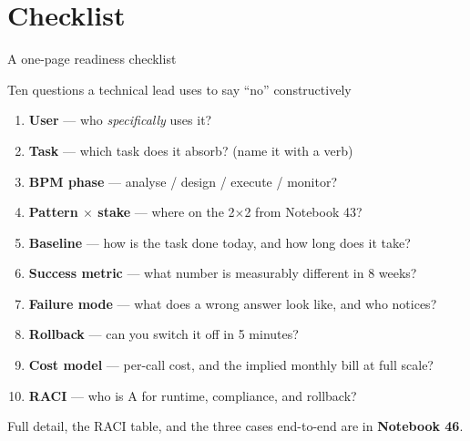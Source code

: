 \documentclass[aspectratio=169,11pt]{beamer}
\begin{document}
\section{Checklist}
\begin{frame}{A one-page readiness checklist}
  \footnotesize
  \begin{block}{Ten questions a technical lead uses to say ``no'' constructively}
    \begin{enumerate}
      \item \textbf{User} --- who \emph{specifically} uses it?
      \item \textbf{Task} --- which task does it absorb? (name it with a verb)
      \item \textbf{BPM phase} --- analyse / design / execute / monitor?
      \item \textbf{Pattern $\times$ stake} --- where on the 2$\times$2 from Notebook 43?
      \item \textbf{Baseline} --- how is the task done today, and how long does it take?
      \item \textbf{Success metric} --- what number is measurably different in 8 weeks?
      \item \textbf{Failure mode} --- what does a wrong answer look like, and who notices?
      \item \textbf{Rollback} --- can you switch it off in 5 minutes?
      \item \textbf{Cost model} --- per-call cost, and the implied monthly bill at full scale?
      \item \textbf{RACI} --- who is A for runtime, compliance, and rollback?
    \end{enumerate}
  \end{block}
  {\footnotesize Full detail, the RACI table, and the three cases end-to-end are in \textbf{Notebook 46}.}
\end{frame}
\end{document}
